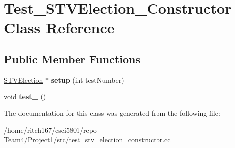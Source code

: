 \hypertarget{classTest__STVElection__Constructor}{}\section{Test\+\_\+\+S\+T\+V\+Election\+\_\+\+Constructor Class Reference}
\label{classTest__STVElection__Constructor}
\subsection*{Public Member Functions}
\begin{DoxyCompactItemize}
\item 
\mbox{\label{classTest__STVElection__Constructor_a89c98c6884155c16804bfbcd7ba5cbce}} 
\hyperlink{classSTVElection}{S\+T\+V\+Election} $\ast$ {\bfseries setup} (int test\+Number)
\item 
\mbox{\label{classTest__STVElection__Constructor_a22279e09bfcd57db2bc8b7fa0aaadb8c}} 
void {\bfseries test\+\_} ()
\end{DoxyCompactItemize}


The documentation for this class was generated from the following file\+:\begin{DoxyCompactItemize}
\item 
/home/ritch167/csci5801/repo-\/\+Team4/\+Project1/src/test\+\_\+stv\+\_\+election\+\_\+constructor.\+cc\end{DoxyCompactItemize}
